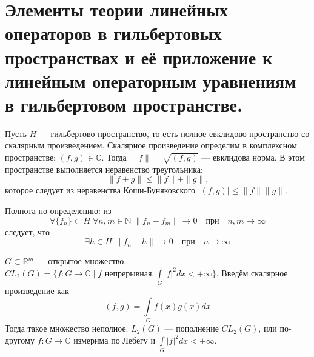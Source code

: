 \documentclass[14pt]{extarticle}
\begin{document}
\section*{Элементы теории линейных операторов в гильбертовых пространствах и её приложение к линейным операторным уравнениям в гильбертовом пространстве.}
Пусть $H$ --- гильбертово пространство, то есть полное евклидово пространство со скалярным произведением.
Скалярное произведение определим в комплексном пространстве: $(f,g) \in \mathbb C$.
Тогда $\|f\| = \sqrt{(f,g)}$ --- евклидова норма.
В этом пространстве выполняется неравенство треугольника:
$$
\|f + g\| \le \|f\| + \|g\|\text{,}
$$
которое следует из неравенства Коши-Буняковского $|(f,g)| \le \|f\|\|g\|$.

Полнота по определению: из
$$
\forall \{f_n\} \subset H\; \forall n,m \in \mathbb N\; \|f_n - f_m\| \to 0 \quad \text{при} \quad n,m \to \infty
$$
следует, что 
$$
\exists h \in H\; \|f_n - h\| \to 0\quad \text{при} \quad n \to \infty
$$

$G \subset \mathbb R^m$ --- открытое множество.
$CL_2(G) = \{f\colon G \to \mathbb C \mid f\text{ непрерывная}, \int\limits_G |f|^2 dx < +\infty\}$.
Введём скалярное произведение как
$$
(f, g) = \int\limits_G f(x) \overline{g(x)} dx
$$
Тогда такое множество неполное.
$L_2(G)$ --- пополнение $CL_2(G)$, или по-другому $f:G \mapsto \mathbb C$ измерима по Лебегу и $\int\limits_G |f|^2 dx < +\infty$.
\end{document}
